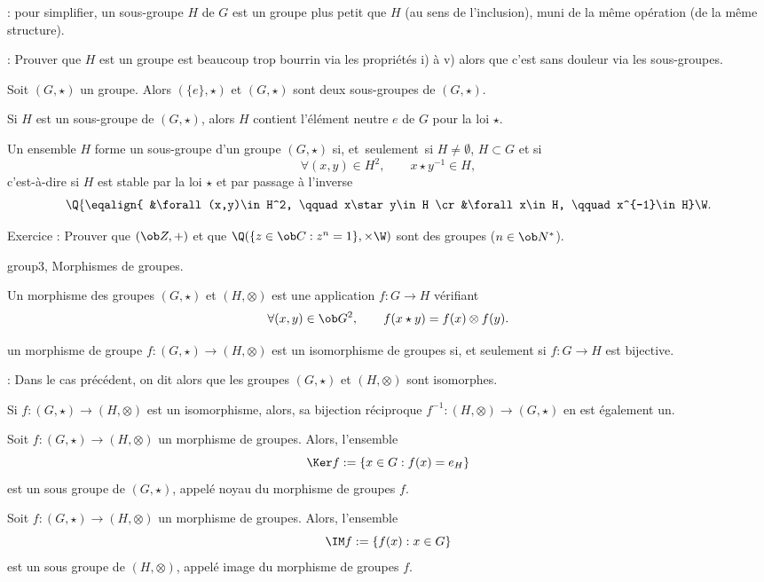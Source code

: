 \Remarque : pour simplifier, un sous-groupe $H$ de $G$ est un groupe plus petit que $H$ (au sens de l'inclusion), muni de la même opération (de la même structure). 
\bigskip

\Remarque : Prouver que $H$ est un groupe est beaucoup trop bourrin via les propriétés i) à v) alors que 
c'est sans douleur via les sous-groupes. 
\bigskip

\Propriete []  Soit $(G,\star)$ un groupe. Alors $(\{e\},\star)$ et $(G,\star)$ sont deux sous-groupes de $(G,\star)$. 
\bigskip

\Propriete []  Si $H$ est un sous-groupe de $(G,\star)$, alors $H$ contient l'élément neutre $e$ de $G$ pour la loi $\star$. 
\bigskip

\Propriete []  Un ensemble $H$ forme un sous-groupe d'un groupe $(G,\star)$ si, et~seulement~si
$H\neq\emptyset$, $H\subset G$ et si 
$$
{\forall (x,y)\in H^2,\qquad x\star y^{-1}\in H}, 
$$
c'est-à-dire si $H$ est stable par la loi $\star$ et par passage à l'inverse
$$
\Q\{
\eqalign{
&\forall (x,y)\in H^2, \qquad x\star y\in H
\cr
&\forall x\in H, \qquad x^{-1}\in H}\W.
$$

Exercice :  Prouver que $(\ob Z, +)$ et que $\Q(\{z\in\ob C:z^n=1\},\times\W)$ sont des groupes ($n\in\ob N^*$). 
\bigskip

\Subsection group3, Morphismes de groupes. 

Un morphisme des groupes $(G,\star)$ et $(H,\otimes)$ est une application $f:G\to H$ vérifiant 
$$
\forall (x,y)\in\ob G^2 , \qquad  f(x\star y)=f(x)\otimes f(y) .
$$ 

\Definition []  un morphisme de groupe $f:(G,\star)\to(H,\otimes)$ est un isomorphisme de groupes si, 
et seulement si $f:G\to H$ est bijective. 
\bigskip

\Remarque : Dans le cas précédent, on dit alors que les groupes $(G,\star)$ et $(H,\otimes)$ sont isomorphes. 
\bigskip

\Propriete []  Si $f:(G,\star)\to(H,\otimes)$ est un isomorphisme, alors, sa bijection réciproque $f^{-1}:(H,\otimes)\to(G,\star)$ 
en est également un. 
\bigskip

\Propriete []  Soit $f:(G,\star)\to (H,\otimes)$ un morphisme de groupes. Alors, l'ensemble 
$$
\Ker f:=\{x\in G:f(x)=e_H\}
$$
est un sous groupe de $(G,\star)$, appelé noyau du morphisme de groupes $f$. 
\bigskip

\Propriete []  Soit $f:(G,\star)\to (H,\otimes)$ un morphisme de groupes. Alors, l'ensemble 
$$
\IM f:=\{f(x):x\in G\}
$$
est un sous groupe de $(H,\otimes)$, appelé image du morphisme de groupes $f$. 
\bigskip

